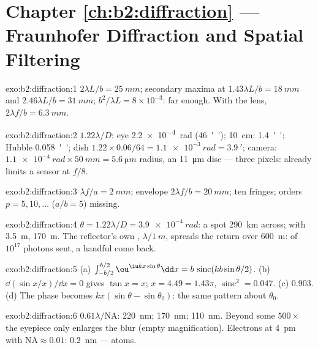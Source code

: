 \section*{Chapter \ref{ch:b2:diffraction} --- Fraunhofer Diffraction and Spatial Filtering}

\begin{solution}{exo:b2:diffraction:1}
$2\lambda L/b = \qty{25}{mm}$; secondary maxima at $1.43\lambda L/b = \qty{18}{mm}$ and
$2.46\lambda L/b = \qty{31}{mm}$;  $b^2/\lambda L = 8 \times 10^{-3}$: far
enough. With the lens, $2\lambda f/b = \qty{6.3}{mm}$.
\end{solution}

\begin{solution}{exo:b2:diffraction:2}
$1.22\lambda/D$: eye \qty{2.2e-4}{rad} (\qty{46}{''}); \qty{10}{cm}: \qty{1.4}{''}; Hubble
\qty{0.058}{''}; dish $1.22 \times 0.06/64 = \qty{1.1e-3}{rad} = \qty{3.9}{'}$; camera:
$\qty{1.1e-4}{rad} \times \qty{50}{mm} = \qty{5.6}{\micro m}$ radius, an \qty{11}{\micro m} disc ---
three pixels:  already limits a sensor at $f/8$.
\end{solution}

\begin{solution}{exo:b2:diffraction:3}
$\lambda f/a = \qty{2}{mm}$; envelope $2\lambda f/b = \qty{20}{mm}$; ten fringes; orders
$p = 5, 10, \dots$ ($a/b = 5$) missing.
\end{solution}

\begin{solution}{exo:b2:diffraction:4}
$\theta = 1.22\lambda/D = \qty{3.9e-4}{rad}$: a spot \qty{290}{km} across; with \qty{3.5}{m},
\qty{170}{m}. The reflector's own , $\lambda/\qty{1}{m}$, spreads the
return over \qty{600}{m}: of $10^{17}$ photons sent, a handful come back.
\end{solution}

\begin{solution}{exo:b2:diffraction:5}
(a) $\int_{-b/2}^{b/2}\eu^{\iu kx\sin\theta}\dd x = b\,\operatorname{sinc}(kb\sin\theta/2)$. (b)
$\dd(\sin x/x)/\dd x = 0$ gives $\tan x = x$; $x = 4.49 = 1.43\pi$, $\operatorname{sinc}^2 =
0.047$. (c) $0.903$. (d) The phase becomes $kx(\sin\theta - \sin\theta_0)$: the
same pattern about $\theta_0$.
\end{solution}

\begin{solution}{exo:b2:diffraction:6}
$0.61\lambda/\mathrm{NA}$: \qty{220}{nm}; \qty{170}{nm}; \qty{110}{nm}. Beyond some $500\times$
the eyepiece only enlarges the blur (empty magnification). Electrons
at \qty{4}{pm} with $\mathrm{NA} \approx 0.01$: \qty{0.2}{nm} --- atoms.
\end{solution}

